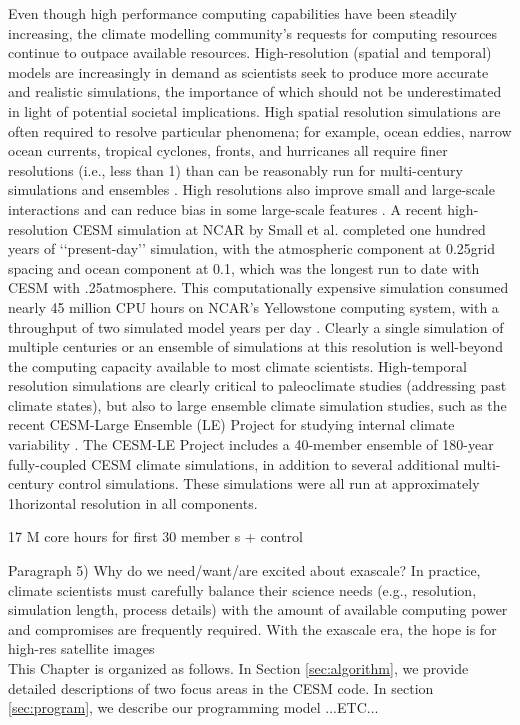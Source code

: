 
Even though high performance computing capabilities have been steadily increasing, the climate modelling community's requests for computing resources continue to outpace available resources.  High-resolution (spatial and temporal) models are increasingly in demand as scientists seek to produce more accurate and realistic simulations, the importance of which should not be underestimated in light of potential societal implications.  High spatial resolution simulations are often required to resolve particular phenomena; for example, ocean eddies, narrow ocean currents, tropical cyclones, fronts, and hurricanes all require finer resolutions (i.e., less than 1\degree) than can be reasonably run for multi-century simulations and ensembles \cite{washington2009, small2014}.  High resolutions also improve small and large-scale interactions and can reduce bias in some large-scale features \cite{small2014}.  A recent high-resolution CESM simulation at NCAR by Small et al. \cite{small2014} completed one hundred years of ‘‘present-day’’ simulation, with the atmospheric component at 0.25\degree grid spacing and ocean component at 0.1\degree, which was the longest run to date with CESM with .25\degree atmosphere.  This computationally expensive simulation consumed nearly 45 million CPU hours on NCAR's Yellowstone computing system, with a throughput of two simulated model years per day \cite{small2014}. Clearly a single simulation of multiple centuries or an ensemble of simulations at this resolution is well-beyond the computing capacity available to most climate scientists.  High-temporal resolution simulations are clearly critical to paleoclimate studies (addressing past climate states), but also to large ensemble climate simulation studies, such as the recent CESM-Large Ensemble (LE) Project for studying internal climate variability \citep{kay2015}.
The
CESM-LE Project includes a 40-member ensemble of 180-year fully-coupled CESM climate
simulations, in addition to several additional multi-century control simulations.  These simulations were all run
at approximately 1\degree horizontal resolution in all components.

17 M core hours for first 30 member s + control
 



{\color{red} Paragraph 5) Why do we need/want/are excited about exascale?}
In practice, climate scientists must carefully balance their science needs (e.g., resolution, simulation length, process details) with the amount of available computing power \cite{washington2009} and compromises are frequently required. With the exascale era, the hope is for \\



high-res satellite images\\




This Chapter is organized as follows. In Section \ref{sec:algorithm}, we provide detailed descriptions of two focus areas in the CESM code. In section \ref{sec:program},  we describe our programming model ...{\color{red}ETC...}
